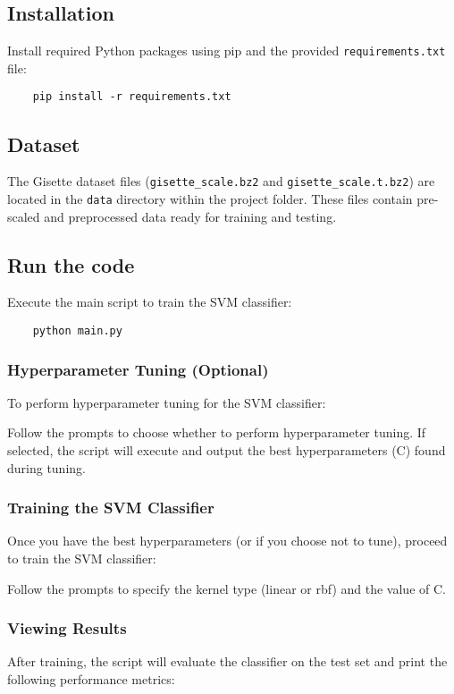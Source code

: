 \documentclass[10pt,a4paper]{article}
\newcounter{para}
\begin{document}
\subsection{Installation}
Install required Python packages using pip and the provided \texttt{requirements.txt} file:

\begin{verbatim}
	pip install -r requirements.txt
\end{verbatim}

\subsection{Dataset}
The Gisette dataset files (\texttt{gisette\_scale.bz2} and \texttt{gisette\_scale.t.bz2}) are located in the \texttt{data} directory within the project folder. These files contain pre-scaled and preprocessed data ready for training and testing.

\subsection{Run the code}
Execute the main script to train the SVM classifier:

\begin{verbatim}
	python main.py
\end{verbatim}

\subsubsection{Hyperparameter Tuning (Optional)}
To perform hyperparameter tuning for the SVM classifier:

Follow the prompts to choose whether to perform hyperparameter tuning. If selected, the script will execute and output the best hyperparameters (C) found during tuning.

\subsubsection{Training the SVM Classifier}
Once you have the best hyperparameters (or if you choose not to tune), proceed to train the SVM classifier:

Follow the prompts to specify the kernel type (linear or rbf) and the value of C.

\subsubsection{Viewing Results}
After training, the script will evaluate the classifier on the test set and print the following performance metrics:
\end{document}
